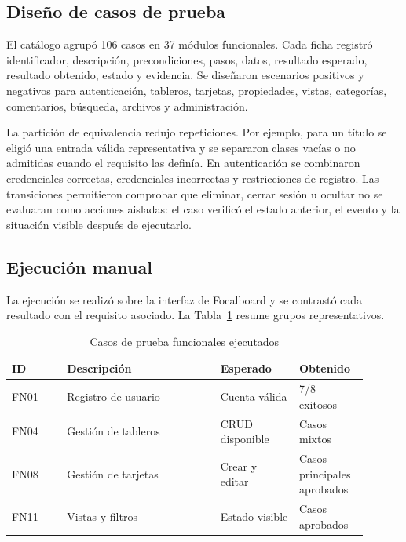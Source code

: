 \documentclass[conference]{IEEEtran}
\begin{document}
\subsection{Diseño de casos de prueba}
El catálogo agrupó 106 casos en 37 módulos funcionales. Cada ficha registró identificador, descripción, precondiciones, pasos, datos, resultado esperado, resultado obtenido, estado y evidencia. Se diseñaron escenarios positivos y negativos para autenticación, tableros, tarjetas, propiedades, vistas, categorías, comentarios, búsqueda, archivos y administración.

La partición de equivalencia redujo repeticiones. Por ejemplo, para un título se eligió una entrada válida representativa y se separaron clases vacías o no admitidas cuando el requisito las definía. En autenticación se combinaron credenciales correctas, credenciales incorrectas y restricciones de registro. Las transiciones permitieron comprobar que eliminar, cerrar sesión u ocultar no se evaluaran como acciones aisladas: el caso verificó el estado anterior, el evento y la situación visible después de ejecutarlo.
\vspace{\baselineskip}

\subsection{Ejecución manual}
La ejecución se realizó sobre la interfaz de Focalboard y se contrastó cada resultado con el requisito asociado. La Tabla~\ref{tab:casos_funcionales} resume grupos representativos.

\begin{table}[htbp]
\caption{Casos de prueba funcionales ejecutados}
\label{tab:casos_funcionales}
\centering
\begin{tabular}{|p{0.14\linewidth}|p{0.39\linewidth}|p{0.20\linewidth}|p{0.17\linewidth}|}
\hline
\textbf{ID} & \textbf{Descripción} & \textbf{Esperado} & \textbf{Obtenido} \\
\hline
FN01 & Registro de usuario & Cuenta válida & 7/8 exitosos \\
\hline
FN04 & Gestión de tableros & CRUD disponible & Casos mixtos \\
\hline
FN08 & Gestión de tarjetas & Crear y editar & Casos principales aprobados \\
\hline
FN11 & Vistas y filtros & Estado visible & Casos aprobados \\
\hline
\end{tabular}
\end{table}
\vspace{\baselineskip}
\end{document}

